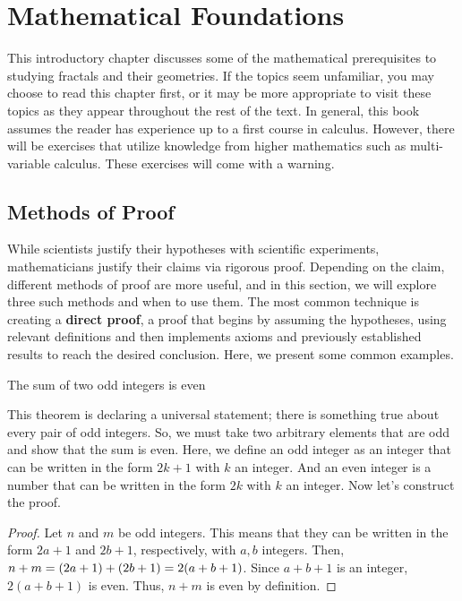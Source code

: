 \chapter{Mathematical Foundations}

\begin{summary}
    This introductory chapter discusses some of the mathematical prerequisites to studying fractals and their geometries. If the topics seem unfamiliar, you may choose to read this chapter first, or it may be more appropriate to visit these topics as they appear throughout the rest of the text. In general, this book assumes the reader has experience up to a first course in calculus. However, there will be exercises that utilize knowledge from higher mathematics such as multi-variable calculus. These exercises will come with a warning. 
\end{summary}

\section{Methods of Proof}

While scientists justify their hypotheses with scientific experiments, mathematicians justify their claims via rigorous proof. Depending on the claim, different methods of proof are more useful, and in this section, we will explore three such methods and when to use them. The most common technique is creating a \textbf{direct proof}, a proof that begins by assuming the hypotheses, using relevant definitions and then implements axioms and previously established results to reach the desired conclusion. Here, we present some common examples. \par

\begin{theorem}
    The sum of two odd integers is even
\end{theorem}

This theorem is declaring a universal statement; there is something true about every pair of odd integers. So, we must take two arbitrary elements that are odd and show that the sum is even. Here, we define an odd integer as an integer that can be written in the form $2k+1$ with $k$ an integer. And an even integer is a number that can be written in the form $2k$
 with $k$ an integer. Now let's construct the proof.
 \clearpage
 
 \begin{proof}
    Let $n$ and $m$ be odd integers. This means that they can be written in the form $2a+1$ and $2b+1$, respectively, with $a,b$ integers. Then, $n+m= \linebreak (2a+1)+(2b+1)=2(a+b+1)$. Since $a+b+1$ is an integer, $2(a+b+1)$ is even. Thus, $n+m$ is even by definition. 
\end{proof}

